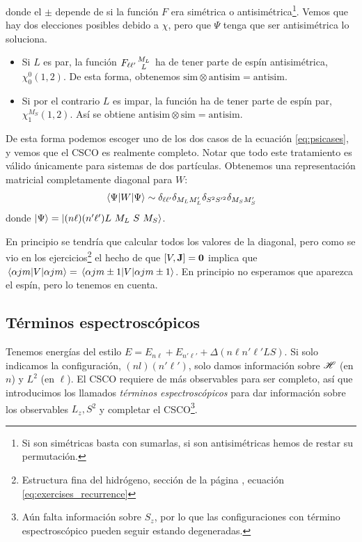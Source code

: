 donde el $\pm$ depende de si la función $F$ era simétrica o
antisimétrica\footnote{Si son simétricas basta con sumarlas, si son
  antisimétricas hemos de restar su permutación.}.
Vemos que hay dos elecciones posibles debido a $\chi$, pero que $\Psi$ tenga que ser
antisimétrica lo soluciona.
\begin{itemize}
\item Si $L$ es par, la función $F_{\ell\ell'}{M_L \atop L}$ ha de tener parte de espín antisimétrica,
  $\chi_0^0(1,2)$. De esta forma, obtenemos $\text{sim}\otimes
  \text{antisim} = \text{antisim}$.
\item Si por el contrario $L$ es impar, la función ha de tener parte
  de espín par, $\chi_1^{M_S}(1,2)$. Así se obtiene $\text{antisim}\otimes
  \text{sim} = \text{antisim}$.
\end{itemize}

De esta forma podemos escoger uno de los dos casos de la
ecuación \eqref{eq:psicases}, y vemos que el CSCO es realmente
completo. Notar que todo este tratamiento es válido únicamente para
sistemas de
dos partículas. Obtenemos una representación matricial completamente
diagonal para $W$:
\begin{equation}
  \ev{W}{\Psi} \sim
  \delta_{\ell\ell'}\delta_{M_L M_L'}\delta_{S^2 S'^2}\delta_{M_S M_S'}
\end{equation}
donde $\ket{\Psi}  = \ket{(n\ell)(n'\ell')L\ M_L\ S\ M_S}$.

En principio se tendría que calcular todos los valores de la diagonal,
pero como se vio en los ejercicios\footnote{Estructura fina del hidrógeno,
  sección de la página \pageref{paragraph:l0vm}, ecuación \ref{eq:exercises_recurrence}}
el hecho de que $[V,\bm{\mathrm{J}}]=\bm{\mathrm{0}}$ implica que $\ev{V}{\alpha j m}
= \ev{V}{\alpha j m\pm 1}$. En principio no esperamos que aparezca el
espín, pero lo tenemos en cuenta. 

\subsection{Términos espectroscópicos}
Tenemos energías del estilo $E = E_{n\ell}+E_{n'\ell'}+\Delta(n\ell n'\ell' L S)$. Si
solo indicamos la configuración, $(nl)(n'\ell')$, solo damos
información sobre $\mathscr{H}$ (en $n$) y $L^2$ (en $\ell$). El CSCO requiere
de más observables para ser completo, así que introducimos los
llamados \emph{términos espectroscópicos} para dar información sobre
los observables $L_z,S^2$ y completar el CSCO\footnote{Aún falta
  información sobre $S_z$, por lo que las configuraciones con término
  espectroscópico pueden seguir estando degeneradas.}.

